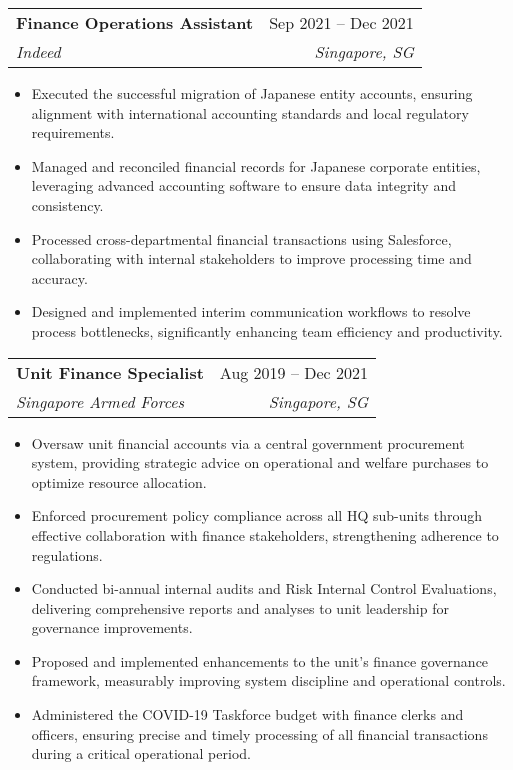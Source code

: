 \documentclass[letterpaper,11pt]{article}
\makeatletter
\newcommand{\resumeItem}[1]{
  \item\small{
    {#1 \vspace{-2pt}}
  }
}
\newcommand{\resumeSubheading}[4]{
  \vspace{-2pt}\item
    \begin{tabular*}{0.97\textwidth}[t]{l@{\extracolsep{\fill}}r}
      \textbf{#1} & #2 \\
      \textit{\small#3} & \textit{\small #4} \\
    \end{tabular*}\vspace{-7pt}
}
\newcommand{\resumeSubSubheading}[2]{
    \item
    \begin{tabular*}{0.97\textwidth}{l@{\extracolsep{\fill}}r}
      \textit{\small#1} & \textit{\small #2} \\
    \end{tabular*}\vspace{-7pt}
}
\newcommand{\resumeSubHeadingListEnd}{\end{itemize}}
\newcommand{\resumeItemListStart}{\begin{itemize}}
\newcommand{\resumeItemListEnd}{\end{itemize}\vspace{-5pt}}
\makeatother
\begin{document}
    \resumeSubheading
      {Finance Operations Assistant}{Sep 2021 -- Dec 2021}
      {Indeed}{Singapore, SG}
        \resumeItemListStart
        \resumeItem{Executed the successful migration of Japanese entity accounts, ensuring alignment with international accounting standards and local regulatory requirements.}
        \resumeItem{Managed and reconciled financial records for Japanese corporate entities, leveraging advanced accounting software to ensure data integrity and consistency.}
        \resumeItem{Processed cross-departmental financial transactions using Salesforce, collaborating with internal stakeholders to improve processing time and accuracy.}
        \resumeItem{Designed and implemented interim communication workflows to resolve process bottlenecks, significantly enhancing team efficiency and productivity.}
    \resumeItemListEnd
      

  \resumeSubheading
    {Unit Finance Specialist}{Aug 2019 -- Dec 2021}
    {Singapore Armed Forces}{Singapore, SG}
    \resumeItemListStart
      \resumeItem{Oversaw unit financial accounts via a central government procurement system, providing strategic advice on operational and welfare purchases to optimize resource allocation.}
      \resumeItem{Enforced procurement policy compliance across all HQ sub-units through effective collaboration with finance stakeholders, strengthening adherence to regulations.}
      \resumeItem{Conducted bi-annual internal audits and Risk Internal Control Evaluations, delivering comprehensive reports and analyses to unit leadership for governance improvements.}
      \resumeItem{Proposed and implemented enhancements to the unit's finance governance framework, measurably improving system discipline and operational controls.}
      \resumeItem{Administered the COVID-19 Taskforce budget with finance clerks and officers, ensuring precise and timely processing of all financial transactions during a critical operational period.}
  \resumeItemListEnd
\end{document}
